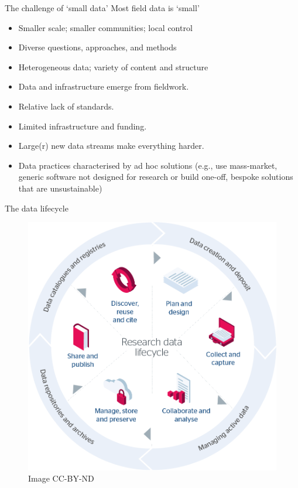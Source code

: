 \begin{frame}{The challenge of `small data'}
   Most field data is `small' \parencite{Borgman2015-rh}
    \begin{itemize}
        \item Smaller scale; smaller communities; local control
        \item Diverse questions, approaches, and methods
        \item Heterogeneous data; variety of content and structure
        \item Data and infrastructure emerge from fieldwork. 
        \item Relative lack of standards.
        \item Limited infrastructure and funding.
        \item Large(r) new data streams make everything harder.
        \item Data practices characterised by ad hoc solutions (e.g., use mass-market, generic software not designed for research or build one-off, bespoke solutions that are unsustainable)
    \end{itemize}
\end{frame}



\begin{frame}{The data lifecycle}
 \begin{figure}[H]
    \centering
    \vspace{-0.5cm}
        \includegraphics[height=.75\textheight]{figures/research-data-life-diagram.png}
        \caption{\cite{Jisc2018-gx} Image CC-BY-ND}
        \label{fig:figure9}
 \end{figure}
\end{frame}

